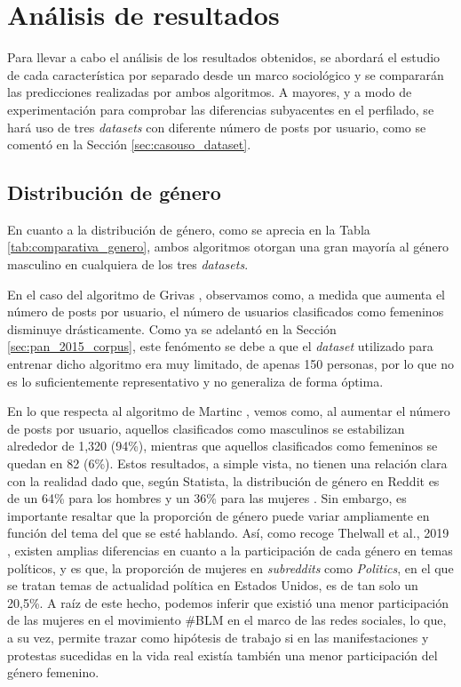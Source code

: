 \section{Análisis de resultados}
\label{sec:casouso_analisis}

Para llevar a cabo el análisis de los resultados obtenidos, se abordará el estudio de cada característica por separado desde un marco sociológico y se
compararán las predicciones realizadas por ambos algoritmos. A mayores, y a modo de experimentación para comprobar las diferencias subyacentes en el perfilado,
se hará uso de tres \textit{datasets} con diferente número de posts por usuario, como se comentó en la Sección \ref{sec:casouso_dataset}.

\subsection{Distribución de género}
\label{subsec:casouso_analisis_genero}

En cuanto a la distribución de género, como se aprecia en la Tabla \ref{tab:comparativa_genero}, ambos algoritmos otorgan una gran mayoría al género masculino en cualquiera de
los tres \textit{datasets}.

\bigskip
En el caso del algoritmo de Grivas \cite{grivas2015author}, observamos como, a medida que aumenta el número de posts por usuario,
el número de usuarios clasificados como femeninos disminuye drásticamente. Como ya se adelantó en la Sección \ref{sec:pan_2015_corpus}, este fenómento se debe a que el \textit{dataset} utilizado para entrenar
dicho algoritmo era muy limitado, de apenas 150 personas, por lo que no es lo suficientemente representativo y no generaliza de forma óptima.

\bigskip
En lo que respecta al algoritmo de Martinc \cite{martinc2019hot}, vemos como, al aumentar el número de posts por usuario, aquellos clasificados como masculinos
se estabilizan alrededor de 1,320 (94\%), mientras que aquellos clasificados como femeninos se quedan en 82 (6\%).
Estos resultados, a simple vista, no tienen una relación clara con la realidad dado que, según Statista, la distribución de género en Reddit es
de un 64\% para los hombres y un 36\% para las mujeres \cite{statistagenero}.
Sin embargo, es importante resaltar que la proporción de género puede variar ampliamente
en función del tema del que se esté hablando. Así, como recoge Thelwall et al., 2019 \cite{thelwall2019she}, existen amplias diferencias en cuanto a la participación
de cada género en temas políticos, y es que, la proporción de mujeres en \textit{subreddits} como \textit{Politics}, en el que se tratan temas de actualidad
política en Estados Unidos, es de tan solo un 20,5\%. A raíz de este hecho, podemos inferir que existió una menor participación de las mujeres en el movimiento \#BLM
en el marco de las redes sociales, lo que, a su vez, permite trazar como hipótesis de trabajo si en las manifestaciones y protestas
sucedidas en la vida real existía también una menor participación del género femenino.

